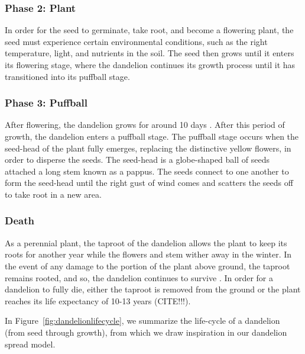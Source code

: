 \subsubsection{Phase 2: Plant}
In order for the seed to germinate, take root, and become a flowering plant, the seed must experience certain environmental conditions, such as the right temperature, light, and nutrients in the soil. The seed then grows until it enters its flowering stage, where the dandelion continues its growth process until it has transitioned into its puffball stage. 

\subsubsection{Phase 3: Puffball}
After flowering, the dandelion grows for around 10 days \cite{noauthor_dandelion_nodate-2}. After this period of growth, the dandelion enters a puffball stage. The puffball stage occurs when the seed-head of the plant fully emerges, replacing the distinctive yellow flowers, in order to disperse the seeds. The seed-head is a globe-shaped ball of seeds attached a long stem known as a pappus. The seeds connect to one another to form the seed-head until the right gust of wind comes and scatters the seeds off to take root in a new area.

\subsubsection{Death}
As a perennial plant, the taproot of the dandelion allows the plant to keep its roots for another year while the flowers and stem wither away in the winter. In the event of any damage to the portion of the plant above ground, the taproot remains rooted, and so, the dandelion continues to survive \cite{}. In order for a dandelion to fully die, either the taproot is removed from the ground or the plant reaches its life expectancy of 10-13 years (CITE!!!).

In Figure~\ref{fig:dandelionlifecycle}, we summarize the life-cycle of a dandelion (from seed through growth), from which we draw inspiration in our dandelion spread model.

